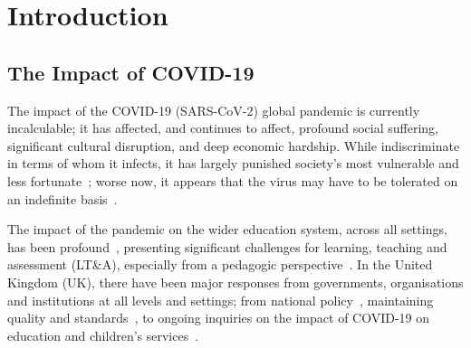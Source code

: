\documentclass[sigconf]{acmart}
\begin{document}


\maketitle

\section{Introduction}\label{intro}

\subsection{The Impact of COVID-19}

The impact of the COVID-19 (SARS-CoV-2) global pandemic is currently
incalculable; it has affected, and continues to affect, profound
social suffering, significant cultural disruption, and deep economic
hardship. While indiscriminate in terms of whom it infects, it has
largely punished society’s most vulnerable and less
fortunate~\cite{vonbraun-et-al:2020,lancetcovid:2020,vanlancker+parolin:2020};
worse now, it appears that the virus may have to be tolerated on an
indefinite basis~\cite{kissler-et-al:2020}.

The impact of the pandemic on the wider education system, across all
settings, has been
profound~\cite{unescocovidedu:2020,armitage+nellums:2020}, presenting
significant challenges for learning, teaching and assessment (LT\&A),
especially from a pedagogic
perspective~\cite{doucet-et-al:2020,oecd:2020,aace:2020}. In the
United Kingdom (UK), there have been major responses from governments,
organisations and institutions at all levels and settings; from
national policy~\cite{dfecovid:2020,wgcontinuity:2020}, maintaining
quality and standards~\cite{qaaqands:2020}, to ongoing inquiries on
the impact of COVID-19 on education and children’s
services~\cite{hocedu:2020,seneddcype:2020}.
\end{document}
